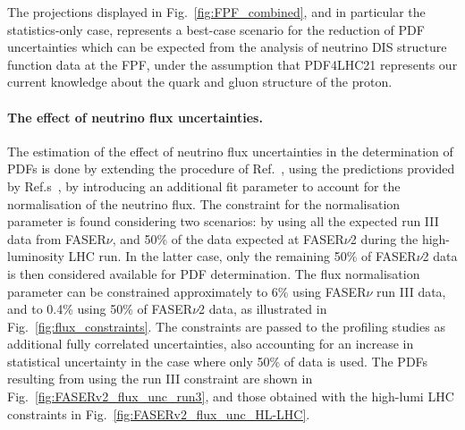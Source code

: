 The projections displayed in
Fig.~\ref{fig:FPF_combined}, and in particular the statistics-only case, represents
a best-case scenario for the reduction of PDF uncertainties which can be expected from
the analysis of neutrino DIS structure function data at the FPF,
under the assumption that PDF4LHC21 represents
our current knowledge about the quark and gluon structure of the proton.

\paragraph{The effect of neutrino flux uncertainties.}
%
The estimation of the effect of neutrino flux uncertainties in the determination of PDFs is done by extending the procedure of Ref.~\cite{Kling:2023tgr}, using the predictions provided by Ref.s~\cite{Ahn:2009wx, Ahn:2011wt, Riehn:2015oba, Fedynitch:2018cbl, Pierog:2013ria, Buonocore:2023kna, Roesler:2000he, Fedynitch:2015kcn, Bai:2020ukz, Bai:2021ira, Bai:2022xad, Ostapchenko:2010vb, Bhattacharya:2023zei, Fieg:2023kld, Maciula:2022lzk}, by introducing an additional fit parameter to account for the normalisation of the neutrino flux. The constraint for the normalisation parameter is found considering two scenarios: by using all the expected run III data from FASER$\nu$, and 50\% of the data expected at FASER$\nu$2 during the high-luminosity LHC run. In the latter case, only the remaining 50\% of FASER$\nu$2 data is then considered available for PDF determination. The flux normalisation parameter can be constrained approximately to 6\% using FASER$\nu$ run III data, and to 0.4\% using 50\% of FASER$\nu$2 data, as illustrated in Fig.~\ref{fig:flux_constraints}. The constraints are passed to the profiling studies as additional fully correlated uncertainties, also accounting for an increase in statistical uncertainty in the case where only 50\% of data is used. The PDFs resulting from using the run III constraint are shown in Fig.~\ref{fig:FASERv2_flux_unc_run3}, and those obtained with the high-lumi LHC constraints in Fig.~\ref{fig:FASERv2_flux_unc_HL-LHC}.


